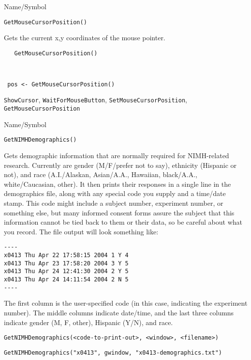 \begin{desc}{Name/Symbol}
\item[Name/Symbol]	\verb+GetMouseCursorPosition()+

\item[Description] Gets the current x,y coordinates of the mouse
  pointer.

\item[Usage]
\begin{verbatim}
   GetMouseCursorPosition()
\end{verbatim}

\item[Example]	
\begin{verbatim}


 pos <- GetMouseCursorPosition()
\end{verbatim}


\item[See Also]
  \verb+ShowCursor+, \verb+WaitForMouseButton+,
  \verb+SetMouseCursorPosition+, \verb+GetMouseCursorPosition+
\end{desc}

\rl


\begin{desc}{Name/Symbol}
\item[Name/Symbol]	\verb+GetNIMHDemographics()+

\item[Description]	Gets demographic information that are normally required for NIMH-related research.  Currently are gender (M/F/prefer not to say), ethnicity (Hispanic or not), and race (A.I./Alaskan, Asian/A.A., Hawaiian, black/A.A., white/Caucasian, other).  
		It then prints their responses in a single line in the demographics file, along with any special code you supply and a time/date stamp. This code might include a subject number, experiment number, or something else, but many informed consent forms assure the subject that this information cannot be tied back to them or their data, so be careful about what you record. The file output will look something like: 
\begin{verbatim}
---- 
x0413 Thu Apr 22 17:58:15 2004 1 Y 4 
x0413 Thu Apr 23 17:58:20 2004 3 Y 5 
x0413 Thu Apr 24 12:41:30 2004 2 Y 5 
x0413 Thu Apr 24 14:11:54 2004 2 N 5 
---- 
\end{verbatim}


	The first column is the user-specified code (in this 
	case, indicating the experiment number).  The middle columns 
	indicate date/time, and the last three columns indicate 
	gender (M, F, other), Hispanic (Y/N), and race.

\item[Usage]
\begin{verbatim}
GetNIMHDemographics(<code-to-print-out>, <window>, <filename>)
\end{verbatim} 

\item[Example]
\begin{verbatim}
GetNIMHDemographics("x0413", gwindow, "x0413-demographics.txt")
\end{verbatim}

\item[See Also]	
\end{desc}

